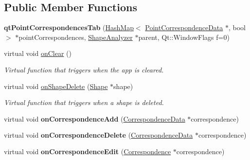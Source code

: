 \subsection*{Public Member Functions}
\begin{DoxyCompactItemize}
\item 
\hypertarget{classqt_point_correspondences_tab_a846ba4575f7b2acf1c4d6bf969a1058a}{}{\bfseries qt\+Point\+Correspondences\+Tab} (\hyperlink{class_hash_map}{Hash\+Map}$<$ \hyperlink{class_point_correspondence_data}{Point\+Correspondence\+Data} $\ast$, bool $>$ $\ast$point\+Correspondences, \hyperlink{class_shape_analyzer}{Shape\+Analyzer} $\ast$parent, Qt\+::\+Window\+Flags f=0)\label{classqt_point_correspondences_tab_a846ba4575f7b2acf1c4d6bf969a1058a}

\item 
virtual void \hyperlink{classqt_point_correspondences_tab_a7e07cc3dbe7981215885d5b9ddab14a8}{on\+Clear} ()
\begin{DoxyCompactList}\small\item\em Virtual function that triggers when the app is cleared. \end{DoxyCompactList}\item 
virtual void \hyperlink{classqt_point_correspondences_tab_a3fd3d809d1686a5397befe85feeac399}{on\+Shape\+Delete} (\hyperlink{class_shape}{Shape} $\ast$shape)
\begin{DoxyCompactList}\small\item\em Virtual function that triggers when a shape is deleted. \end{DoxyCompactList}\item 
\hypertarget{classqt_point_correspondences_tab_abd778bdd1cac74a256c487e396c1b91c}{}virtual void {\bfseries on\+Correspondence\+Add} (\hyperlink{class_correspondence_data}{Correspondence\+Data} $\ast$correspondence)\label{classqt_point_correspondences_tab_abd778bdd1cac74a256c487e396c1b91c}

\item 
\hypertarget{classqt_point_correspondences_tab_a4cce7bd311c4d4076cdb62c77526b913}{}virtual void {\bfseries on\+Correspondence\+Delete} (\hyperlink{class_correspondence_data}{Correspondence\+Data} $\ast$correspondence)\label{classqt_point_correspondences_tab_a4cce7bd311c4d4076cdb62c77526b913}

\item 
\hypertarget{classqt_point_correspondences_tab_a31bacf4fea3333cbd8bcc1fc04e67d02}{}virtual void {\bfseries on\+Correspondence\+Edit} (\hyperlink{class_correspondence}{Correspondence} $\ast$correspondence)\label{classqt_point_correspondences_tab_a31bacf4fea3333cbd8bcc1fc04e67d02}


\end{DoxyCompactItemize}
